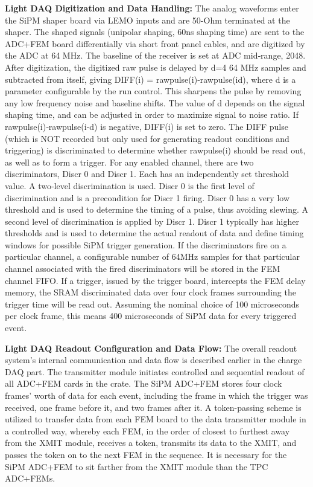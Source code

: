 \noindent\textbf{Light DAQ Digitization and Data Handling:} The analog waveforms enter the SiPM shaper board via LEMO inputs and are 50-Ohm terminated at the shaper. The shaped signals (unipolar shaping, 60ns shaping time) are sent to the ADC+FEM board differentially via short front panel cables, and are digitized by the ADC at 64 MHz. The baseline of the receiver is set at ADC mid‐range, 2048. After digitization, the digitized raw pulse is delayed by d=4 64 MHz samples and subtracted from itself, giving DIFF(i) = rawpulse(i)‐rawpulse(id), where d is a parameter configurable by the run control. This sharpens the pulse by removing any low frequency noise and baseline shifts. The value of d depends on the signal shaping time, and can be adjusted in order to maximize signal to noise ratio. If rawpulse(i)‐rawpulse(i‐d) is negative, DIFF(i) is set to zero. The DIFF pulse (which is NOT recorded but only used for generating readout conditions and triggering) is discriminated to determine whether rawpulse(i) should be read out, as well as to form a trigger. For any enabled channel, there are two discriminators, Discr 0 and Discr 1. Each has an independently set threshold value. A two‐level discrimination is used. Discr 0 is the first level of discrimination and is a precondition for Discr 1 firing. Discr 0 has a very low threshold and is used to determine the timing of a pulse, thus avoiding slewing. A second level of discrimination is applied by Discr 1. Discr 1 typically has higher thresholds and is used to determine the actual readout of data and define timing windows for possible SiPM trigger generation. If the discriminators fire on a particular channel, a configurable number of 64MHz samples for that particular channel associated with the fired discriminators will be stored in the FEM channel FIFO. If a trigger, issued by the trigger board, intercepts the FEM delay memory, the SRAM discriminated data over four clock frames surrounding the trigger time will be read out. Assuming the nominal choice of 100 microseconds per clock frame, this means 400 microseconds of SiPM data for every triggered event. 

\textbf{Light DAQ Readout Configuration and Data Flow:} The overall readout system's internal communication and data flow is described earlier in the charge DAQ part. The transmitter module initiates controlled and sequential readout of all ADC+FEM cards in the crate. The SiPM ADC+FEM stores four clock frames' worth of data for each event, including the frame in which the trigger was received, one frame before it, and two frames after it. A token-passing scheme is utilized to transfer data from each FEM board to the data transmitter module in a controlled way, whereby each FEM, in the order of closest to furthest away from the XMIT module, receives a token, transmits its data to the XMIT, and passes the token on to the next FEM in the sequence. It is necessary for the SiPM ADC+FEM to sit farther from the XMIT module than the TPC ADC+FEMs.



